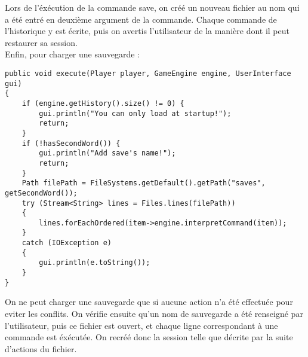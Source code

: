 \documentclass[11pt,a4paper]{report}
\begin{document}
Lors de l'éxécution de la commande save, on créé un nouveau fichier au nom qui a été entré en deuxième argument de la commande. Chaque commande de l'historique y est écrite, puis on avertis l'utilisateur de la manière dont il peut restaurer sa session.\\
Enfin, pour charger une sauvegarde :
\begin{lstlisting}
public void execute(Player player, GameEngine engine, UserInterface gui)
{
    if (engine.getHistory().size() != 0) {
        gui.println("You can only load at startup!");
        return;
    }
    if (!hasSecondWord()) {
        gui.println("Add save's name!");
        return;
    }
    Path filePath = FileSystems.getDefault().getPath("saves", getSecondWord());
    try (Stream<String> lines = Files.lines(filePath))
    {
        lines.forEachOrdered(item->engine.interpretCommand(item));
    }
    catch (IOException e)
    {
        gui.println(e.toString());
    }
}
\end{lstlisting}
On ne peut charger une sauvegarde que si aucune action n'a été effectuée pour eviter les conflits. On vérifie ensuite qu'un nom de sauvegarde a été renseigné par l'utilisateur, puis ce fichier est ouvert, et chaque ligne correspondant à une commande est éxécutée. On recréé donc la session telle que décrite par la suite d'actions du fichier.
\end{document}
